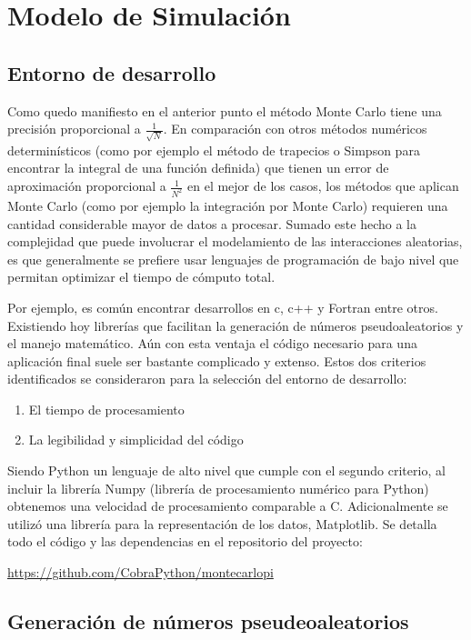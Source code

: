 \documentclass{rbf}
\begin{document}
\section{Modelo de Simulación}
\subsection{Entorno de desarrollo}

Como quedo manifiesto en el anterior punto el método Monte Carlo tiene una precisión proporcional a $\frac{1}{\sqrt{N}}$. En comparación con otros métodos numéricos determinísticos (como por ejemplo el método de trapecios o Simpson para encontrar la integral de una función definida) que tienen un error de aproximación proporcional a $\frac{1}{N^2}$ en el mejor de los casos, los métodos que aplican Monte Carlo (como por ejemplo la integración por Monte Carlo) requieren una cantidad considerable mayor de datos a procesar. Sumado este hecho a la complejidad que puede involucrar el modelamiento de las interacciones aleatorias, es que generalmente se prefiere usar lenguajes de programación de bajo nivel que permitan optimizar el tiempo de cómputo total.

Por ejemplo, es común encontrar desarrollos en c, c++ y Fortran entre otros. Existiendo hoy librerías que facilitan la generación de números pseudoaleatorios y el manejo matemático. Aún con esta ventaja el código necesario para una aplicación final suele ser bastante complicado y extenso.
Estos dos criterios identificados se consideraron para la selección del entorno de desarrollo:

\begin{enumerate}
    \item El tiempo de procesamiento
    \item La legibilidad y simplicidad del código
\end{enumerate}


Siendo Python un lenguaje de alto nivel que cumple con el segundo criterio, al incluir la librería Numpy (librería de procesamiento numérico para Python) obtenemos una velocidad de procesamiento comparable a C. Adicionalmente se utilizó una librería para la representación de los datos, Matplotlib.
Se detalla todo el código y las dependencias en el repositorio del proyecto:

\url{https://github.com/CobraPython/montecarlopi}

\subsection{Generación de números pseudeoaleatorios}
\end{document}
